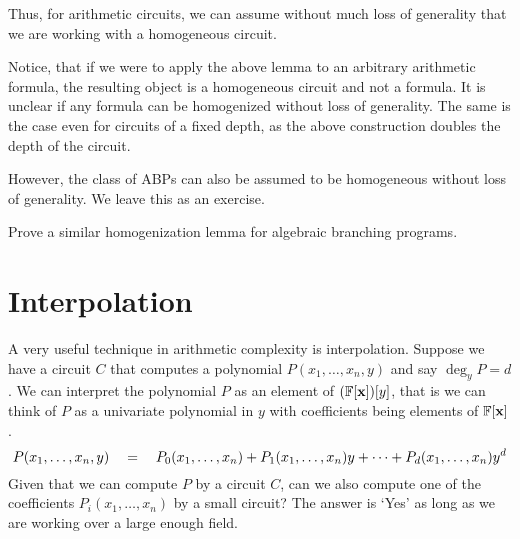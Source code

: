 Thus, for arithmetic circuits, we can assume without much loss of generality that we are working with a homogeneous circuit. 

\begin{remark*}
Notice, that if we were to apply the above lemma to an arbitrary arithmetic formula, the resulting object is a homogeneous circuit and not a formula.
It is unclear if any formula can be homogenized without loss of generality. 
The same is the case even for circuits of a fixed depth, as the above construction doubles the depth of the circuit. 

However, the class of ABPs can also be assumed to be homogeneous without loss of generality. 
We leave this as an exercise. 
\end{remark*}

\begin{exercise}
Prove a similar homogenization lemma for algebraic branching programs. 
\end{exercise}

\section{Interpolation}

A very useful technique in arithmetic complexity is interpolation. Suppose we have a circuit $C$ that computes a polynomial $P(x_1,\ldots, x_n, y)$ and say $\deg_y P = d$. We can interpret the polynomial $P$ as an element of $(\mathbb{F}[\mathbf{x}])[y]$, that is we can think of $P$ as a univariate polynomial in $y$ with coefficients being elements of $\mathbb{F}[\mathbf{x}]$. 
\[
P(x_1,\ldots, x_n, y) \quad = \quad P_0(x_1,\ldots, x_n) + P_1(x_1,\ldots, x_n) y + \cdots + P_d(x_1,\ldots, x_n) y^d
\]
Given that we can compute $P$ by a circuit $C$, can we also compute one of the coefficients $P_i(x_1,\ldots, x_n)$ by a small circuit? The answer is `Yes' as long as we are working over a large enough field. 

